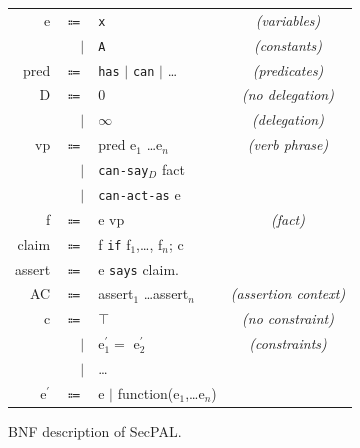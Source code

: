 \documentclass[thesis.tex]{subfiles}
\begin{document}
\newcommand{\bnfcomment}[1]{\slshape{\color{gray} (#1)}}
\newcommand{\secpal}[1]{\texttt{#1}}
\begin{figure}\footnotesize
  \begin{tabular}{r r l c}
    e          & $\Coloneqq$ & \secpal{x}                                       & \bnfcomment{variables}         \\
               & $\vert$     & \secpal{A}                                       & \bnfcomment{constants}         \\
    pred       & $\Coloneqq$ & \secpal{has} $\vert$ \secpal{can} $\vert$ \dots  & \bnfcomment{predicates}        \\
    D          & $\Coloneqq$ & 0                                                & \bnfcomment{no delegation}     \\
               & $\vert$     & $\infty$                                         & \bnfcomment{delegation}        \\
    vp         & $\Coloneqq$ & pred e$_1$ \dots e$_n$                           & \bnfcomment{verb phrase}       \\
               & $\vert$     & \secpal{can-say}$_D$ fact                       \\
               & $\vert$     & \secpal{can-act-as}  e                          \\
    f          & $\Coloneqq$ & e vp                                             & \bnfcomment{fact}              \\
    claim      & $\Coloneqq$ & f \secpal{if} f$_1$,\dots, f$_n$; c             \\
    assert     & $\Coloneqq$ & e \secpal{says} claim.                          \\
    AC         & $\Coloneqq$ & assert$_1$ \dots assert$_n$                      & \bnfcomment{assertion context} \\
    c          & $\Coloneqq$ & $\top$                                           & \bnfcomment{no constraint}     \\
               & $\vert$     & e$^\prime_1 =$ e$^\prime_2$                      & \bnfcomment{constraints}       \\
               & $\vert$     & \dots                                           \\
    e$^\prime$ & $\Coloneqq$ & e $\vert$ function(e$_1$,\dots e$_n$)           \\


  \end{tabular}
  \caption{BNF description of SecPAL.}
\label{fig:secpal-grammar}
\end{figure}
\end{document}
